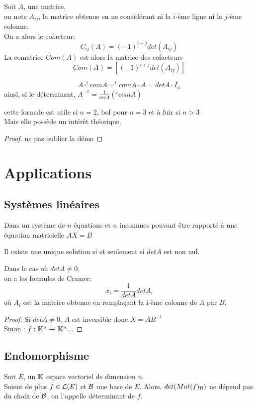 \documentclass[../main.tex]{subfile}
\begin{document}
\begin{rap}
	Soit $A$, une matrice, \\
	on note $A_{ij}$, la matrice obtenue en ne considérant ni la $i$-ème ligne ni la $j$-ème colonne.\\
	On a alors le cofacteur:\\
	$$C_{ij}(A) = (-1)^{i+j} det(A_{ij})$$
	La comatrice $Com(A)$ est alors la matrice des cofacteurs
	$$Com(A) = \left[(-1)^{i+j} det(A_{ij})\right]$$
\end{rap}

\begin{prop}
	$$A \cdot ^tcom A = ^tcom A \cdot A = det A \cdot I_n$$
	ainsi, si le déterminant, $A^{-1}=\frac{1}{det A} (^tcom A)$
\end{prop}
\begin{rema}
	cette formule est utile si $n = 2$, bof pour $n=3$ et à fuir si $n>3$\\
	Mais elle possède un intérêt théorique.
\end{rema}

\begin{proof}
	ne pas oublier la démo
\end{proof}

\section{Applications}
\subsection{Systèmes linéaires}
Dans un système de $n$ équations et $n$ inconnues pouvant être rapporté à une équation matricielle $AX=B$\\
\begin{prop}
	Il existe une unique solution si et seulement si $det A$ est non nul.
\end{prop}

Dans le cas où $det A \neq 0$, \\
on a les formules de Cramer:
$$x_i = \frac{1}{det A} det A_i$$
où $A_i$ est la matrice obtenue en remplaçant la i-ème colonne de $A$ par $B$.\\

\begin{proof}
	Si $det A \neq 0$, $A$ est inversible donc $X = AB^{-1}$\\
	Sinon :
	$f: \mathbb{K}^n \to \mathbb{K}^n$...%
\end{proof}

\subsection{Endomorphisme}
\begin{defi}
	Soit $E$, un $\mathbb{K}$ espace vectoriel de dimension $n$.\\
	Soient de plus $f \in \mathcal{L}(E)$ et $\mathcal{B}$ une base de $E$.
	Alors, $det(Mat(f)_{\mathcal{B}})$ ne dépend pas du choix de $\mathcal{B}$, on l'appelle déterminant de $f$.
\end{defi}
\end{document}
